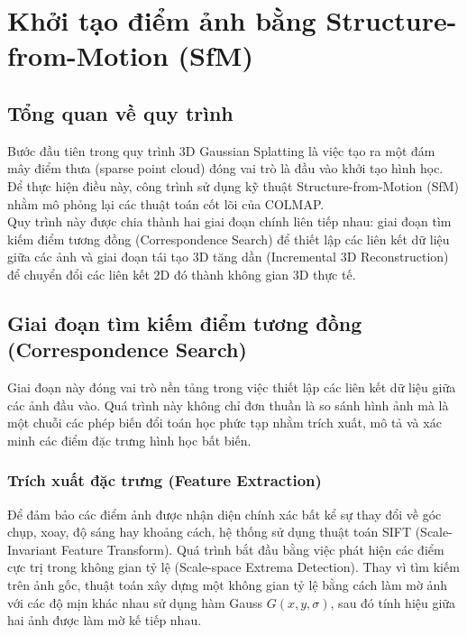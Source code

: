 \newpage
\section{Khởi tạo điểm ảnh bằng Structure-from-Motion (SfM)}
\subsection{Tổng quan về quy trình}

Bước đầu tiên trong quy trình 3D Gaussian Splatting là việc tạo ra một đám mây điểm thưa (sparse point cloud) đóng vai trò là đầu vào khởi tạo hình học. Để thực hiện điều này, công trình sử dụng kỹ thuật Structure-from-Motion (SfM) nhằm mô phỏng lại các thuật toán cốt lõi của COLMAP. \\

Quy trình này được chia thành hai giai đoạn chính liên tiếp nhau: giai đoạn tìm kiếm điểm tương đồng (Correspondence Search) để thiết lập các liên kết dữ liệu giữa các ảnh và giai đoạn tái tạo 3D tăng dần (Incremental 3D Reconstruction) để chuyển đổi các liên kết 2D đó thành không gian 3D thực tế.

\subsection{Giai đoạn tìm kiếm điểm tương đồng (Correspondence Search)}

Giai đoạn này đóng vai trò nền tảng trong việc thiết lập các liên kết dữ liệu giữa các ảnh đầu vào. Quá trình này không chỉ đơn thuần là so sánh hình ảnh mà là một chuỗi các phép biến đổi toán học phức tạp nhằm trích xuất, mô tả và xác minh các điểm đặc trưng hình học bất biến.

\subsubsection{Trích xuất đặc trưng (Feature Extraction)}

Để đảm bảo các điểm ảnh được nhận diện chính xác bất kể sự thay đổi về góc chụp, xoay, độ sáng hay khoảng cách, hệ thống sử dụng thuật toán SIFT (Scale-Invariant Feature Transform). Quá trình bắt đầu bằng việc phát hiện các điểm cực trị trong không gian tỷ lệ (Scale-space Extrema Detection). Thay vì tìm kiếm trên ảnh gốc, thuật toán xây dựng một không gian tỷ lệ bằng cách làm mờ ảnh với các độ mịn khác nhau sử dụng hàm Gauss $G(x, y, \sigma)$, sau đó tính hiệu giữa hai ảnh được làm mờ kế tiếp nhau. \\

